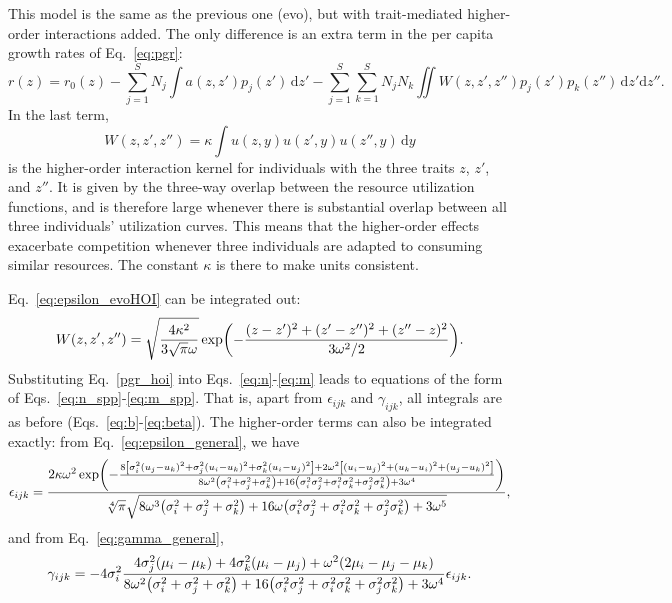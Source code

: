 \documentclass[10pt]{article}
\newcommand{\ud}{\text{d}}
\let\originalleft\left
\let\originalright\right
\renewcommand{\left}{\mathopen{}\mathclose\bgroup\originalleft}
\renewcommand{\right}{\aftergroup\egroup\originalright}
\begin{document}
This model is the same as the previous one (evo), but with trait-mediated higher-order interactions added. The only difference is an extra term in the per capita growth rates of Eq.~\ref{eq:pgr}:
\begin{equation}
  \label{pgr_hoi}
  r(z) = r_0(z) - \sum_{j=1}^S N_j \int a(z,z') p_j(z') \,\ud z' - \sum_{j=1}^{S} \sum_{k=1}^{S}N_{j}N_{k} \iint W(z,z',z'') p_{j}(z') p_{k}(z'') \,\ud z' \ud z'' .
\end{equation}
In the last term,
\begin{equation}
  \label{eq:epsilon_evoHOI}
  W(z,z',z'') = \kappa \int u(z,y) u(z', y) u(z'',y) \,\ud y
\end{equation}
is the higher-order interaction kernel for individuals with the three traits $z$, $z'$, and $z''$. It is given by the three-way overlap between the resource utilization functions, and is therefore large whenever there is substantial overlap between all three individuals' utilization curves. This means that the higher-order effects exacerbate competition whenever three individuals are adapted to consuming similar resources. The constant $\kappa$ is there to make units consistent.

Eq.~\ref{eq:epsilon_evoHOI} can be integrated out:
\begin{equation}
  \label{eq:epsilon_evoHOI_int}
  W(z,z',z'') = \sqrt{\frac{4\kappa^2}{3 \sqrt{\pi} \omega}} \exp \left(-\frac{(z-z')^2+(z'-z'')^2+(z''-z)^2}{3 \omega^2 / 2}\right) .
\end{equation}
Substituting Eq.~\ref{pgr_hoi} into Eqs.~\ref{eq:n}-\ref{eq:m} leads to equations of the form of Eqs.~\ref{eq:n_spp}-\ref{eq:m_spp}. That is, apart from $\epsilon_{ijk}$ and $\gamma_{ijk}$, all integrals are as before (Eqs.~\ref{eq:b}-\ref{eq:beta}). The higher-order terms can also be integrated exactly: from Eq.~\ref{eq:epsilon_general}, we have
\begin{equation}
  \label{hoi_kernel}
  \epsilon_{ijk} = \frac{2 \kappa \omega^2 \exp \left(-\frac{8 \left[\sigma_i^2 (u_j-u_k)^2 + \sigma_j^2 (u_i-u_k)^2 + \sigma_k^2 (u_i-u_j)^2 \right] + 2 \omega^2 \left[(u_i-u_j)^2+(u_k-u_i)^2+(u_j-u_k)^2\right]}{8 \omega^2 \left(\sigma_i^2+\sigma_j^2+\sigma_k^2\right)+16 \left(\sigma_i^2\sigma_j^2+\sigma_i^2\sigma_k^2+\sigma_j^2 \sigma_k^2\right)+3 \omega^4}\right)}{\sqrt[4]{\pi} \sqrt{8 \omega ^3 \left(\sigma_i^2+\sigma_j^2+\sigma_k^2\right)+16 \omega  \left(\sigma_i^2\sigma_j^2+\sigma_i^2\sigma_k^2+\sigma_j^2 \sigma_k^2\right)+3 \omega^5}} ,
\end{equation}
and from Eq.~\ref{eq:gamma_general},
\begin{equation}
  \label{hoi_kernel_m}
  \gamma_{ijk} = -4 \sigma_i^2 \frac{4 \sigma_j^2 (\mu_i -\mu_k) + 4 \sigma_k^2 (\mu_i - \mu_j) + \omega^2 (2\mu_i - \mu_j - \mu_k)}{8 \omega^2 \left(\sigma_i^2+\sigma_j^2+\sigma_k^2\right) + 16 \left(\sigma_i^2 \sigma_j^2 + \sigma_i^2 \sigma_k^2 + \sigma_j^2 \sigma_k^2 \right) + 3\omega^4} \epsilon_{ijk} .
\end{equation}
\end{document}
